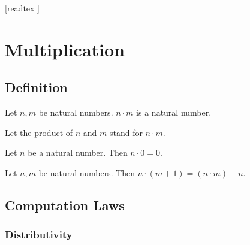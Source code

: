 \documentclass[10pt]{article}
\begin{document}
  \begin{imports}
    \begin{forthel}
      [readtex ]
    \end{forthel}
  \end{imports}


  \section*{Multiplication}

  \subsection*{Definition}

  \begin{forthel}
    \begin{signature}[id=ARITHMETIC_06_6626346484629504,printid]
      Let $n, m$ be natural numbers.
      $n \cdot m$ is a natural number.
    \end{signature}

    Let the product of $n$ and $m$ stand for $n \cdot m$.
  \end{forthel}

  \begin{forthel}
    \begin{axiom}[id=ARITHMETIC_06_8941041092657152,printid]
      Let $n$ be a natural number.
      Then $n \cdot 0 = 0$.
    \end{axiom}
  \end{forthel}

  \begin{forthel}
    \begin{axiom}[id=ARITHMETIC_06_2211275408932864,printid]
      Let $n, m$ be natural numbers.
      Then $n \cdot (m + 1) = (n \cdot m) + n$.
    \end{axiom}
  \end{forthel}


  \subsection*{Computation Laws}

  \subsubsection*{Distributivity}
\end{document}
